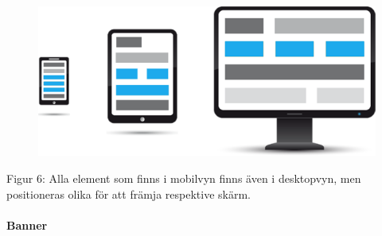 \documentclass[11pt]{article}
\begin{document}
\vspace{0.3cm}
\begin{figure}[H]
\centerline{%
\hspace{1.5cm}
\includegraphics[scale=0.4]{pics/responsivebildimp.png}\\
}
\end{figure}
Figur 6: Alla element som finns i mobilvyn finns även i desktopvyn, men positioneras olika för att främja respektive skärm.

\paragraph{Banner}\mbox{}
\end{document}
